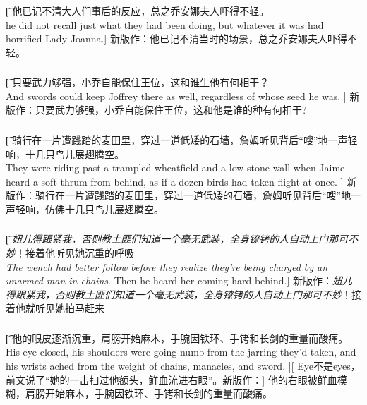 \documentclass[12pt,a4paper]{article}
\begin{document}
\subsubsection{}\t[
	他已记不清大人们事后的反应，总之乔安娜夫人吓得不轻。\\
	he did not recall just what they had been doing, but whatever it was had horrified Lady Joanna.]
	新版作：他已记不清当时的场景，总之乔安娜夫人吓得不轻。		
	
\subsubsection{}\t[
	只要武力够强，小乔自能保住王位，这和谁生他有何相干？\\
	And swords could keep Joffrey there as well, regardless of whose seed he was. ]
	新版作：只要武力够强，小乔自能保住王位，这和他是谁的种有何相干?

\subsubsection{}\t[
	骑行在一片遭践踏的麦田里，穿过一道低矮的石墙，詹姆听见背后“嗖”地一声轻响，十几只鸟儿展翅腾空。\\
	They were riding past a trampled wheatfield and a low stone wall when Jaime heard a soft thrum from behind, as if a dozen birds had taken flight at once. ]
	新版作：骑行在一片遭践踏的麦田里，穿过一道低矮的石墙，詹姆听见背后“嗖”地一声轻响，仿佛十几只鸟儿展翅腾空。
	
\subsubsection{}\t[	
	\emph{妞儿得跟紧我，否则教土匪们知道一个毫无武装，全身镣铐的人自动上门那可不妙}！接着他听见她沉重的呼吸\\
	\emph{The wench had better follow before they realize they're being charged by an unarmed man in chains}. Then he heard her coming hard behind.]
	新版作：\emph{妞儿得跟紧我，否则教土匪们知道一个毫无武装，全身镣铐的人自动上门那可不妙}！接着他就听见她拍马赶来
	
\subsubsection{}\t[
	他的眼皮逐渐沉重，肩膀开始麻木，手腕因铁环、手铐和长剑的重量而酸痛。\\
	His eye closed, his shoulders were going numb from the jarring they'd taken, and his wrists ached from the weight of chains, manacles, and sword. ][
	Eye不是eyes，前文说了“她的一击扫过他额头，鲜血流进右眼”。新版作：]
	他的右眼被鲜血模糊，肩膀开始麻木，手腕因铁环、手铐和长剑的重量而酸痛。
	
\end{document}
